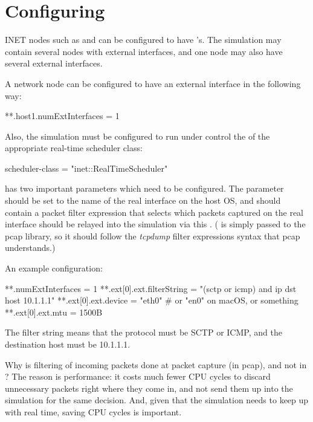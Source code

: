 \section{Configuring}
\label{sec:emulation:configuring}

INET nodes such as  and 
can be configured to have 's.
The simulation may contain several nodes with external interfaces,
and one node may also have several external interfaces.

A network node can be configured to have an external interface
in the following way:

\begin{inifile}
**.host1.numExtInterfaces = 1
\end{inifile}

Also, the simulation must be configured to run under control the of the
appropriate real-time scheduler class:

\begin{inifile}
scheduler-class = "inet::RealTimeScheduler"
\end{inifile}

 has two important parameters which need to be
configured. The  parameter should be set to the name of the real
interface on the host OS, and  should contain a packet
filter expression that selects which packets captured on the real interface
should  be relayed into the simulation via this .
( is simply passed to the pcap library, so it should
follow the \textit{tcpdump} filter expressions syntax that pcap understands.)

An example configuration:

\begin{inifile}
**.numExtInterfaces = 1
**.ext[0].ext.filterString = "(sctp or icmp) and ip dst host 10.1.1.1"
**.ext[0].ext.device = "eth0" # or "en0" on macOS, or something
**.ext[0].ext.mtu = 1500B
\end{inifile}

The filter string  means
that the protocol must be SCTP or ICMP, and the destination host must be
10.1.1.1.

\begin{note}
Why is filtering of incoming packets done at packet capture (in pcap),
and not in ? The reason is performance: it costs
much fewer CPU cycles to discard unnecessary packets right where
they come in, and not send them up into the simulation for the
same decision. And, given that the simulation needs to keep up with
real time, saving CPU cycles is important.
\end{note}

